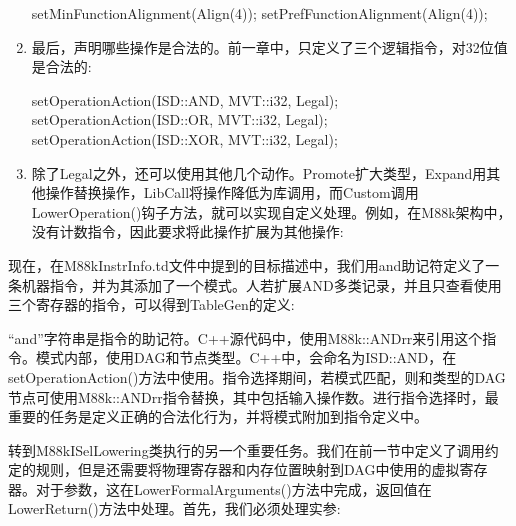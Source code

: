 \begin{enumerate}
\begin{cpp}
setMinFunctionAlignment(Align(4));
setPrefFunctionAlignment(Align(4));
\end{cpp}

\item
最后，声明哪些操作是合法的。前一章中，只定义了三个逻辑指令，对32位值是合法的:

\begin{cpp}
setOperationAction(ISD::AND, MVT::i32, Legal);
setOperationAction(ISD::OR, MVT::i32, Legal);
setOperationAction(ISD::XOR, MVT::i32, Legal);
\end{cpp}

\item
除了Legal之外，还可以使用其他几个动作。Promote扩大类型，Expand用其他操作替换操作，LibCall将操作降低为库调用，而Custom调用LowerOperation()钩子方法，就可以实现自定义处理。例如，在M88k架构中，没有计数指令，因此要求将此操作扩展为其他操作:

\begin{cpp}
    setOperationAction(ISD::CTPOP, MVT::i32, Expand);
}
\end{cpp}
\end{enumerate}

现在，在M88kInstrInfo.td文件中提到的目标描述中，我们用and助记符定义了一条机器指令，并为其添加了一个模式。人若扩展AND多类记录，并且只查看使用三个寄存器的指令，可以得到TableGen的定义:


“and”字符串是指令的助记符。C++源代码中，使用M88k::ANDrr来引用这个指令。模式内部，使用DAG和节点类型。C++中，会命名为ISD::AND，在setOperationAction()方法中使用。指令选择期间，若模式匹配，则和类型的DAG节点可使用M88k::ANDrr指令替换，其中包括输入操作数。进行指令选择时，最重要的任务是定义正确的合法化行为，并将模式附加到指令定义中。


转到M88kISelLowering类执行的另一个重要任务。我们在前一节中定义了调用约定的规则，但是还需要将物理寄存器和内存位置映射到DAG中使用的虚拟寄存器。对于参数，这在LowerFormalArguments()方法中完成，返回值在LowerReturn()方法中处理。首先，我们必须处理实参:

